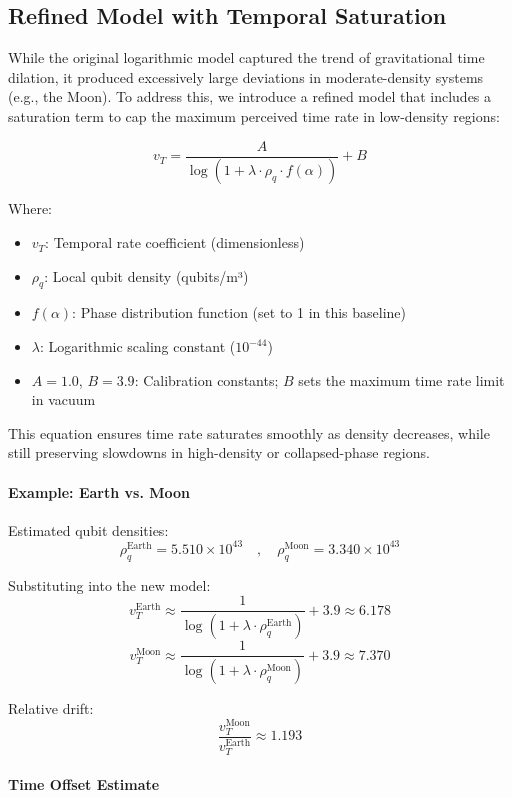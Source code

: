 \documentclass[12pt]{report} %
\begin{document}
\subsection{Refined Model with Temporal Saturation}

While the original logarithmic model captured the trend of gravitational time dilation, it produced excessively large deviations in moderate-density systems (e.g., the Moon). To address this, we introduce a refined model that includes a saturation term to cap the maximum perceived time rate in low-density regions:

\[
v_T = \frac{A}{\log\left(1 + \lambda \cdot \rho_q \cdot f(\alpha)\right)} + B
\]

Where:
\begin{itemize}
  \item \(v_T\): Temporal rate coefficient (dimensionless)
  \item \(\rho_q\): Local qubit density (qubits/m³)
  \item \(f(\alpha)\): Phase distribution function (set to 1 in this baseline)
  \item \(\lambda\): Logarithmic scaling constant (\(10^{-44}\))
  \item \(A = 1.0\), \(B = 3.9\): Calibration constants; \(B\) sets the maximum time rate limit in vacuum
\end{itemize}

This equation ensures time rate saturates smoothly as density decreases, while still preserving slowdowns in high-density or collapsed-phase regions.

\paragraph{Example: Earth vs. Moon}

Estimated qubit densities:
\[
\rho_q^{\text{Earth}} = 5.510 \times 10^{43} \quad , \quad \rho_q^{\text{Moon}} = 3.340 \times 10^{43}
\]

Substituting into the new model:
\[
v_T^{\text{Earth}} \approx \frac{1}{\log(1 + \lambda \cdot \rho_q^{\text{Earth}})} + 3.9 \approx 6.178
\]
\[
v_T^{\text{Moon}} \approx \frac{1}{\log(1 + \lambda \cdot \rho_q^{\text{Moon}})} + 3.9 \approx 7.370
\]

Relative drift:
\[
\frac{v_T^{\text{Moon}}}{v_T^{\text{Earth}}} \approx 1.193
\]

\paragraph{Time Offset Estimate}
\end{document}

